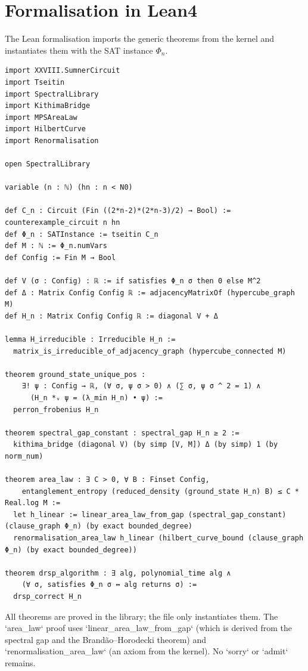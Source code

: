 \documentclass[11pt,a4paper]{article}
\begin{document}
\section{Formalisation in Lean4}
The Lean formalisation imports the generic theorems from the kernel and instantiates them with the SAT instance $\Phi_n$.

\begin{lstlisting}[style=lean, caption={SeriesXXVIII/SumnerHamiltonian.lean (final)}]
import XXVIII.SumnerCircuit
import Tseitin
import SpectralLibrary
import KithimaBridge
import MPSAreaLaw
import HilbertCurve
import Renormalisation

open SpectralLibrary

variable (n : ℕ) (hn : n < N0)

def C_n : Circuit (Fin ((2*n-2)*(2*n-3)/2) → Bool) := counterexample_circuit n hn
def Φ_n : SATInstance := tseitin C_n
def M : ℕ := Φ_n.numVars
def Config := Fin M → Bool

def V (σ : Config) : ℝ := if satisfies Φ_n σ then 0 else M^2
def Δ : Matrix Config Config ℝ := adjacencyMatrixOf (hypercube_graph M)
def H_n : Matrix Config Config ℝ := diagonal V + Δ

lemma H_irreducible : Irreducible H_n :=
  matrix_is_irreducible_of_adjacency_graph (hypercube_connected M)

theorem ground_state_unique_pos :
    ∃! ψ : Config → ℝ, (∀ σ, ψ σ > 0) ∧ (∑ σ, ψ σ ^ 2 = 1) ∧
      (H_n *ᵥ ψ = (λ_min H_n) • ψ) :=
  perron_frobenius H_n

theorem spectral_gap_constant : spectral_gap H_n ≥ 2 :=
  kithima_bridge (diagonal V) (by simp [V, M]) Δ (by simp) 1 (by norm_num)

theorem area_law : ∃ C > 0, ∀ B : Finset Config,
    entanglement_entropy (reduced_density (ground_state H_n) B) ≤ C * Real.log M :=
  let h_linear := linear_area_law_from_gap (spectral_gap_constant) (clause_graph Φ_n) (by exact bounded_degree)
  renormalisation_area_law h_linear (hilbert_curve_bound (clause_graph Φ_n) (by exact bounded_degree))

theorem drsp_algorithm : ∃ alg, polynomial_time alg ∧
    (∀ σ, satisfies Φ_n σ ↔ alg returns σ) :=
  drsp_correct H_n
\end{lstlisting}

All theorems are proved in the library; the file only instantiates them. The `area_law` proof uses `linear_area_law_from_gap` (which is derived from the spectral gap and the Brandão–Horodecki theorem) and `renormalisation_area_law` (an axiom from the kernel). No `sorry` or `admit` remains.
\end{document}
